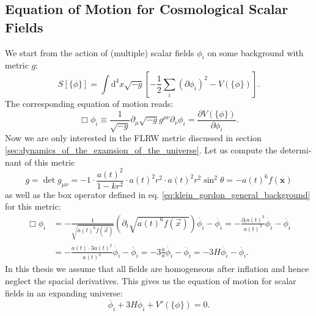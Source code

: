 \documentclass[master,       %
               twoside,        %
               BCOR10mm,       %
               english,ngerman, %
               ]{GAUBM}
\begin{document}
\begin{otherlanguage}{english}
\subsection{Equation of Motion for Cosmological Scalar Fields}
We start from the action of (multiple) scalar fields $\phi_i$ on some background with metric $g$:
\begin{equation}
	S[\{\phi\}] = \int \mathrm{d}^4 x \sqrt{-g} \left[- \frac{1}{2} \sum_i (\partial \phi_i)^2 - V(\{\phi\}) \right].
\end{equation}
The corresponding equation of motion reads:
\begin{equation}
	\label{eq:klein_gordon_general_background}
	\Box \phi_i \equiv \frac{1}{\sqrt{-g}} \partial_\mu \sqrt{-g} g^{\mu \nu} \partial_\nu \phi_i = \frac{\partial V(\{\phi\})}{\partial \phi_i}.
\end{equation}
Now we are only interested in the FLRW metric discussed in section \ref{sec:dynamics_of_the_examsion_of_the_universe}.
Let us compute the determinant of this metric
\begin{equation}
	g = \det g_{\mu \nu} = -1 \cdot \frac{a(t)^2}{1 - kr^2} \cdot a(t)^2 r^2 \cdot a(t)^2 r^2 \sin^2 \theta = - a(t)^6 f(\mathbf{x})
\end{equation}
as well as the box operator defined in eq. \eqref{eq:klein_gordon_general_background} for this metric:
\begin{align}
	    \Box \phi_i
	    &= - \frac{1}{\sqrt{a(t)^6 f(\vec{x})}} (\partial_t \sqrt{ a(t)^6 f(\vec{x}) }) \dot{\phi_i} - \ddot{\phi_i}
	    = - \frac{\partial_t a(t)^3}{a(t)^3} \dot{\phi_i} - \ddot{\phi_i} \nonumber \\
	    &= - \frac{\dot{a}(t) \cdot 3 a(t)^2}{a(t)^3} \dot{\phi_i} - \ddot{\phi_i}
	    = - 3 \frac{\dot{a}}{a} \dot{\phi_i} - \ddot{\phi_i}
	    = - 3H \dot{\phi_i} - \ddot{\phi_i}.
\end{align}
In this thesis we assume that all fields are homogeneous after inflation and hence neglect the spacial derivatives.
This gives us the equation of motion for scalar fields in an expanding universe:
\begin{equation}
	\label{eq:scalar_field_eom}
	\ddot{\phi_i} + 3 H \dot{\phi_i} + V'(\{\phi\}) = 0.
\end{equation}


\end{otherlanguage}
\end{document}
